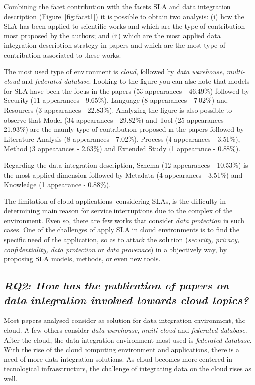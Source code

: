 Combining the facet contribution with the facets SLA and data integration description 
(Figure~\ref{fig:facet1}) it is possible to obtain two analysis: 
(i) how the SLA has been applied to scientific works and which are the type of contribution 
most proposed by the authors; and (ii) which are the most applied data integration description
strategy in papers and which are the most type of contribution associated to these works. 

The most used type of environment is \textit{cloud}, followed by \textit{data
warehouse, multi-cloud} and \textit{federated database}. Looking to the figure
you can alse note that models for SLA have been the focus in the papers (53 appearances - 46.49\%) followed by Security (11 appearances - 9.65\%), Language 
(8 appearances - 7.02\%) and Resources (3 appearances - 22.83\%).
Analyzing the figure is also possible to observe that Model (34 appearances - 29.82\%) and 
Tool (25 appearances - 21.93\%) are the mainly type of contribution proposed in the papers 
followed by Literature Analysis (8 appearances - 7.02\%), Process (4 appearances - 3.51\%), 
Method (3 appearances - 2.63\%) and Extended Study (1 appearance - 0.88\%).

Regarding the data integration description, Schema (12 appearances - 10.53\%) is
the most applied dimension followed by Metadata (4 appearances - 3.51\%) and
Knowledge (1 appearance - 0.88\%).

The limitation of cloud applications, considering SLAs, is the difficulty in
determining main reason for service interruptions due to the complex of
the environment. Even so, there are few works that consider \textit{data
protection} in such cases. One of the challenges of apply SLA in cloud
environments is to find the specific need of the application, so as to attack
the solution (\textit{security, privacy, confidentiality, data protection} or
\textit{data provenace}) in a objectively way, by proposing SLA models, methods,
or even new tools.



\subsection{\textit{RQ2: How has the publication of papers on data integration
involved towards cloud topics?}}

Most papers analysed consider as solution for data integration environment, the
cloud. A few others consider \textit{data warehouse}, \textit{muiti-cloud} and
\textit{federated database}. After the cloud, the data integration environment
most used is \textit{federated database}. With the rise of the cloud computing
environment and applications, there is a need of more data integration
solutions. As cloud becomes more centered in tecnological infraestructure, the
challenge of integrating data on the cloud rises as well. 

